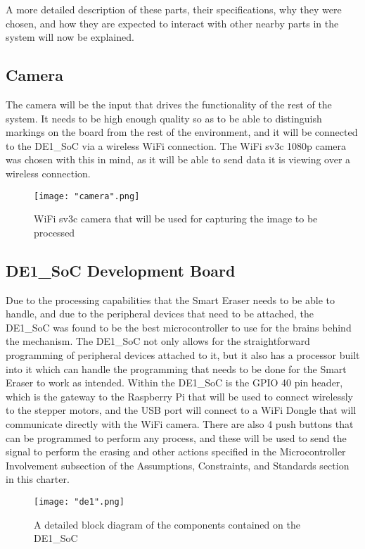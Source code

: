 A more detailed description of these parts, their specifications, why they were chosen, and how they are expected to interact with other nearby parts in the system will now be explained.

\subsection{Camera}
The camera will be the input that drives the functionality of the rest of the system. It needs to be high enough quality so as to be able to distinguish markings on the board from the rest of the environment, and it will be connected to the DE1\_SoC via a wireless WiFi connection. The WiFi sv3c 1080p camera was chosen with this in mind, as it will be able to send data it is viewing over a wireless connection.

\begin{figure}[H]
	\centering
	{\texttt{[image: "camera".png]}}
	\caption{WiFi sv3c camera that will be used for capturing the image to be processed\cite{cam} }
	\label{fig:cam}
\end{figure}

\subsection{DE1\_SoC Development Board}
Due to the processing capabilities that the Smart Eraser needs to be able to handle, and due to the peripheral devices that need to be attached, the DE1\_SoC was found to be the best microcontroller to use for the brains behind the mechanism. The DE1\_SoC not only allows for the straightforward programming of peripheral devices attached to it, but it also has a processor built into it which can handle the programming that needs to be done for the Smart Eraser to work as intended. Within the DE1\_SoC is the GPIO 40 pin header, which is the gateway to the Raspberry Pi that will be used to connect wirelessly to the stepper motors, and the USB port will connect to a WiFi Dongle that will communicate directly with the WiFi camera. There are also 4 push buttons that can be programmed to perform any process, and these will be used to send the signal to perform the erasing and other actions specified in the Microcontroller Involvement subsection of the Assumptions, Constraints, and Standards section in this charter.

\begin{figure}[H]
	\centering
	{\texttt{[image: "de1".png]}}
	\caption{A detailed block diagram of the components 
		contained on the DE1\_SoC\cite{de1} }
	\label{fig:de1}
\end{figure}

